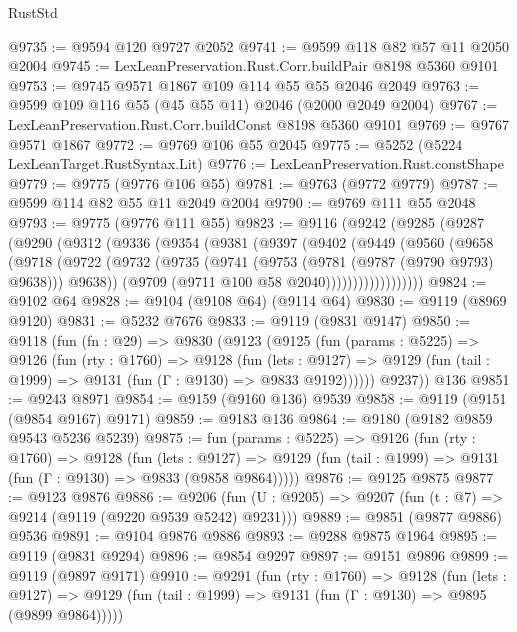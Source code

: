 \begin{lexlean}{RustStd}
\begin{coremodule}
@9735 := @9594 @120 @9727 @2052
@9741 := @9599 @118 @82 @57 @11 @2050 @2004
@9745 := LexLeanPreservation.Rust.Corr.buildPair @8198 @5360 @9101
@9753 := @9745 @9571 @1867 @109 @114 @55 @55 @2046 @2049
@9763 := @9599 @109 @116 @55 (@45 @55 @11) @2046 (@2000 @2049 @2004)
@9767 := LexLeanPreservation.Rust.Corr.buildConst @8198 @5360 @9101
@9769 := @9767 @9571 @1867
@9772 := @9769 @106 @55 @2045
@9775 := @5252 (@5224 LexLeanTarget.RustSyntax.Lit)
@9776 := LexLeanPreservation.Rust.constShape
@9779 := @9775 (@9776 @106 @55)
@9781 := @9763 (@9772 @9779)
@9787 := @9599 @114 @82 @55 @11 @2049 @2004
@9790 := @9769 @111 @55 @2048
@9793 := @9775 (@9776 @111 @55)
@9823 := @9116
    (@9242
      (@9285
        (@9287
          (@9290
            (@9312
              (@9336
                (@9354
                  (@9381
                    (@9397
                      (@9402
                        (@9449
                          (@9560
                            (@9658
                              (@9718
                                (@9722
                                  (@9732
                                    (@9735
                                      (@9741 (@9753 (@9781 (@9787 (@9790 @9793) @9638))) @9638))
                                    (@9709 (@9711 @100 @58 @2040))))))))))))))))))
@9824 := @9102 @64
@9828 := @9104 (@9108 @64) (@9114 @64)
@9830 := @9119 (@8969 @9120)
@9831 := @5232 @7676
@9833 := @9119 (@9831 @9147)
@9850 := @9118
    (fun (fn : @29) =>
    @9830
      (@9123
        (@9125
          (fun (params : @5225) =>
          @9126
            (fun (rty : @1760) =>
            @9128
              (fun (lets : @9127) =>
              @9129 (fun (tail : @1999) => @9131 (fun (Γ : @9130) => @9833 @9192))))))
        @9237))
    @136
@9851 := @9243 @8971
@9854 := @9159 (@9160 @136) @9539
@9858 := @9119 (@9151 (@9854 @9167) @9171)
@9859 := @9183 @136
@9864 := @9180 (@9182 @9859 @9543 @5236 @5239)
@9875 := fun (params : @5225) =>
  @9126
    (fun (rty : @1760) =>
    @9128
      (fun (lets : @9127) =>
      @9129 (fun (tail : @1999) => @9131 (fun (Γ : @9130) => @9833 (@9858 @9864)))))
@9876 := @9125 @9875
@9877 := @9123 @9876
@9886 := @9206 (fun (U : @9205) => @9207 (fun (t : @7) => @9214 (@9119 (@9220 @9539 @5242) @9231)))
@9889 := @9851 (@9877 @9886) @9536
@9891 := @9104 @9876 @9886
@9893 := @9288 @9875 @1964
@9895 := @9119 (@9831 @9294)
@9896 := @9854 @9297
@9897 := @9151 @9896
@9899 := @9119 (@9897 @9171)
@9910 := @9291
    (fun (rty : @1760) =>
    @9128
      (fun (lets : @9127) =>
      @9129 (fun (tail : @1999) => @9131 (fun (Γ : @9130) => @9895 (@9899 @9864)))))

\end{coremodule}
\end{lexlean}
